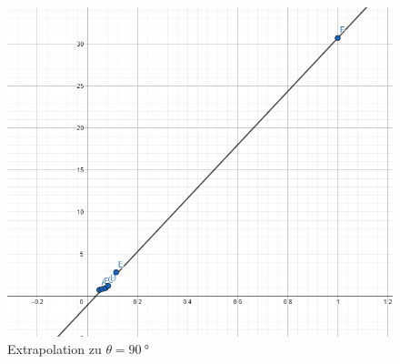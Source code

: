 \documentclass[a4paper, titlepage]{article}
\begin{document}
    \begin{figure}
        \includegraphics[width=\textwidth]{images/extrapolation_cart_large}
        \caption{Extrapolation zu $\theta = \SI{90}{\degree}$}
        \label{extrapolation_large_cart}
    \end{figure}

    \nocite{*}
    
    
\end{document}
